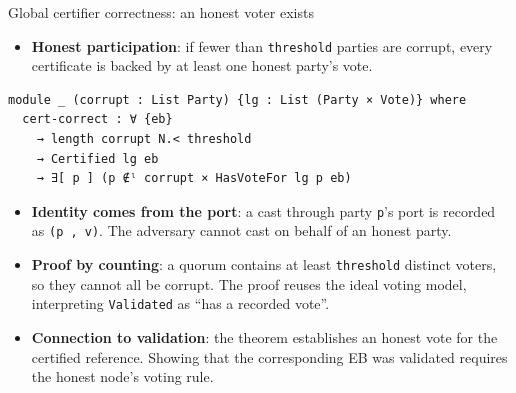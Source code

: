 \documentclass[aspectratio=169,10pt]{beamer}
\newcommand{\agda}[1]{\texttt{#1}}
\begin{document}
\begin{frame}[fragile]{Global certifier correctness: an honest voter exists}
  \begin{itemize}\small
    \item \textbf{Honest participation}: if fewer than \agda{threshold}
          parties are corrupt, every certificate is backed by at least one
          honest party's vote.
  \end{itemize}
\begin{verbatim}
module _ (corrupt : List Party) {lg : List (Party × Vote)} where
  cert-correct : ∀ {eb}
    → length corrupt N.< threshold
    → Certified lg eb
    → ∃[ p ] (p ∉ˡ corrupt × HasVoteFor lg p eb)
\end{verbatim}
  \begin{itemize}\small
    \item \textbf{Identity comes from the port}: a cast through party
          \agda{p}'s port is recorded as \agda{(p , v)}.  The adversary
          cannot cast on behalf of an honest party.
    \item \textbf{Proof by counting}: a quorum contains at least
          \agda{threshold} distinct voters, so they cannot all be corrupt.
          The proof reuses the ideal voting model, interpreting
          \agda{Validated} as ``has a recorded vote''.
    \item \textbf{Connection to validation}: the theorem establishes an
          honest vote for the certified reference.  Showing that the
          corresponding EB was validated requires the honest node's voting rule.
  \end{itemize}
\end{frame}
\end{document}
